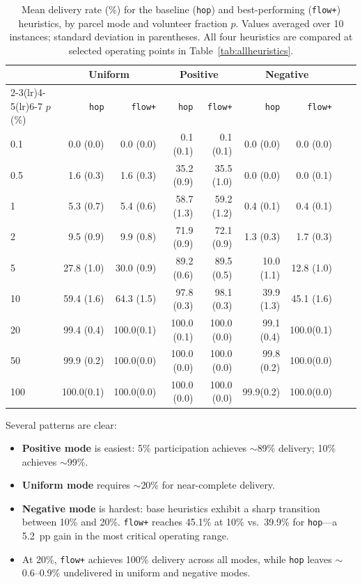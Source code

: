 \documentclass[11pt,a4paper]{article}
\begin{document}
\begin{table}[ht]
\centering
\caption{Mean delivery rate (\%) for the baseline (\texttt{hop}) and
         best-performing (\texttt{flow+}) heuristics, by parcel mode and
         volunteer fraction $p$. Values averaged over 10 instances; standard
         deviation in parentheses. All four heuristics are compared at
         selected operating points in Table~\ref{tab:allheuristics}.}
\label{tab:delivery}
\small
\begin{tabular}{lrrrrrrrr}
\toprule
 & \multicolumn{2}{c}{Uniform} & \multicolumn{2}{c}{Positive} & \multicolumn{2}{c}{Negative} \\
\cmidrule(lr){2-3}\cmidrule(lr){4-5}\cmidrule(lr){6-7}
$p$ (\%) & \texttt{hop} & \texttt{flow+} & \texttt{hop} & \texttt{flow+} & \texttt{hop} & \texttt{flow+} \\
\midrule
  0.1  & 0.0 (0.0) & 0.0 (0.0) &  0.1 (0.1) &  0.1 (0.1) & 0.0 (0.0) & 0.0 (0.0) \\
  0.5  & 1.6 (0.3) & 1.6 (0.3) & 35.2 (0.9) & 35.5 (1.0) & 0.0 (0.0) & 0.0 (0.1) \\
  1    & 5.3 (0.7) & 5.4 (0.6) & 58.7 (1.3) & 59.2 (1.2) & 0.4 (0.1) & 0.4 (0.1) \\
  2    & 9.5 (0.9) & 9.9 (0.8) & 71.9 (0.9) & 72.1 (0.9) & 1.3 (0.3) & 1.7 (0.3) \\
  5    &27.8 (1.0) &30.0 (0.9) & 89.2 (0.6) & 89.5 (0.5) &10.0 (1.1) &12.8 (1.0) \\
 10    &59.4 (1.6) &64.3 (1.5) & 97.8 (0.3) & 98.1 (0.3) &39.9 (1.3) &45.1 (1.6) \\
 20    &99.4 (0.4) &100.0(0.1) &100.0 (0.1) &100.0 (0.0) &99.1 (0.4) &100.0(0.1) \\
 50    &99.9 (0.2) &100.0(0.0) &100.0 (0.0) &100.0 (0.0) &99.8 (0.2) &100.0(0.0) \\
100    &100.0(0.1) &100.0(0.0) &100.0 (0.0) &100.0 (0.0) & 99.9(0.2) &100.0(0.0) \\
\bottomrule
\end{tabular}
\end{table}

Several patterns are clear:

\begin{itemize}
  \item \textbf{Positive mode} is easiest: 5\% participation achieves
        $\sim$89\% delivery; 10\% achieves $\sim$99\%.
  \item \textbf{Uniform mode} requires $\sim$20\% for near-complete delivery.
  \item \textbf{Negative mode} is hardest: base heuristics exhibit a sharp
        transition between 10\% and 20\%.
        \texttt{flow+} reaches 45.1\% at 10\% vs.\ 39.9\% for \texttt{hop}---a
        5.2~pp gain in the most critical operating range.
  \item At 20\%, \texttt{flow+} achieves 100\% delivery across all modes,
        while \texttt{hop} leaves $\sim$0.6--0.9\% undelivered in uniform
        and negative modes.
\end{itemize}
\end{document}
